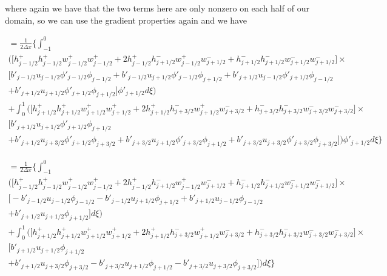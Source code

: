 \documentclass[12pt]{article}
\begin{document}
where again we have that the two terms here are only nonzero on each half of our domain, so we can use the gradient properties again and we have 

\begin{multline}
= \frac{1}{2\Delta x} \bigg\lbrace \int_{-1}^{0} \\
\bigg(\bigg[ h^+_{j-1/2}h^+_{j-1/2} w^+_{j-1/2}w^+_{j-1/2}  + 2h^+_{j-1/2}h^-_{j+1/2} w^+_{j-1/2} w^-_{j+1/2} + h^-_{j+1/2}h^-_{j+1/2} w^-_{j+1/2}w^-_{j+1/2}\bigg] \times \\\big[b'_{j-1/2}u_{j-1/2} \phi'_{j-1/2} \phi_{j-1/2} + b'_{j-1/2}u_{j+1/2} \phi'_{j-1/2} \phi_{j+1/2}  + b'_{j+1/2} u_{j-1/2}\phi'_{j+1/2} \phi_{j-1/2} \\+ b'_{j+1/2}u_{j+1/2} \phi'_{j+1/2} \phi_{j+1/2}  \big]\phi'_{j+1/2}  d\xi \bigg) \\ +  \int_{0}^{1}\bigg(\bigg[h^+_{j+1/2}h^+_{j+1/2} w^+_{j+1/2}w^+_{j+1/2}+ 2h^+_{j+1/2}h^-_{j+3/2} w^+_{j+1/2} w^-_{j+3/2} + h^-_{j+3/2}h^-_{j+3/2} w^-_{j+3/2}w^-_{j+3/2}\bigg] \times\\\big[ b'_{j+1/2}u_{j+1/2} \phi'_{j+1/2} \phi_{j+1/2} \\ +   b'_{j+1/2}u_{j+3/2} \phi'_{j+1/2} \phi_{j+3/2} +   b'_{j+3/2} u_{j+1/2} \phi'_{j+3/2} \phi_{j+1/2} +  b'_{j+3/2}u_{j+3/2} \phi'_{j+3/2}  \phi_{j+3/2}  \big]  \bigg) \phi'_{j+1/2} d\xi \bigg\rbrace 
\end{multline}


\begin{multline}
= \frac{1}{2\Delta x} \bigg\lbrace \int_{-1}^{0} \\
\bigg(\bigg[ h^+_{j-1/2}h^+_{j-1/2} w^+_{j-1/2}w^+_{j-1/2}  + 2h^+_{j-1/2}h^-_{j+1/2} w^+_{j-1/2} w^-_{j+1/2} + h^-_{j+1/2}h^-_{j+1/2} w^-_{j+1/2}w^-_{j+1/2}\bigg] \times \\\big[-b'_{j-1/2}u_{j-1/2}\phi_{j-1/2} - b'_{j-1/2}u_{j+1/2} \phi_{j+1/2}  + b'_{j+1/2} u_{j-1/2} \phi_{j-1/2} \\+ b'_{j+1/2}u_{j+1/2} \phi_{j+1/2}  \big] d\xi \bigg) \\ +  \int_{0}^{1}\bigg(\bigg[h^+_{j+1/2}h^+_{j+1/2} w^+_{j+1/2}w^+_{j+1/2}+ 2h^+_{j+1/2}h^-_{j+3/2} w^+_{j+1/2} w^-_{j+3/2} + h^-_{j+3/2}h^-_{j+3/2} w^-_{j+3/2}w^-_{j+3/2}\bigg] \times\\\big[ b'_{j+1/2}u_{j+1/2} \phi_{j+1/2} \\ +   b'_{j+1/2}u_{j+3/2} \phi_{j+3/2} -  b'_{j+3/2} u_{j+1/2}\phi_{j+1/2} -  b'_{j+3/2}u_{j+3/2}\phi_{j+3/2}  \big]  \bigg) d\xi \bigg\rbrace 
\end{multline}
\end{document}
